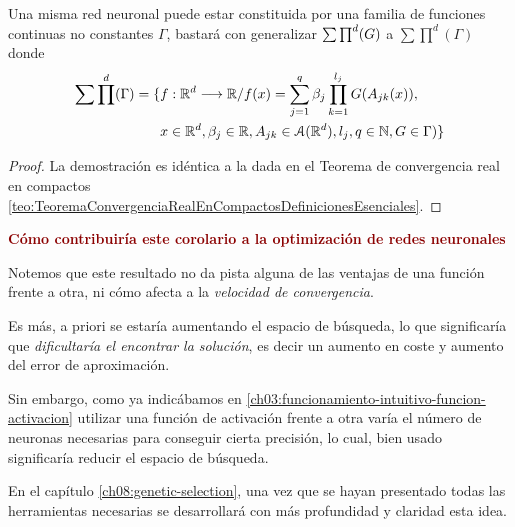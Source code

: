 \begin{aportacionOriginal}

\begin{corolario} \label{cor:se-generaliza-G-a-una-familia}

    Una misma red neuronal puede estar constituida por una familia de funciones continuas no constantes $\Gamma$, 
    bastará con generalizar $\sum \prod^d (G)$ a $\sum \prod ^d (\Gamma)$ donde 
    \begin{equation}
        \begin{split}
            \sum \prod^d (\Gamma) = \{ 
                &f: \mathbb{R}^d \longrightarrow \mathbb{R} /
                f(x) = \sum_{j = 1} ^q  \beta_j \prod_{k=1}^{l_j}
                G(A_{jk}(x)), \\
                &x  \in \mathbb{R}^d, \beta_j \in \mathbb{R}, A_{jk}\in \mathcal{A}(\mathbb{R}^d), l_j,q \in \mathbb{N}, G \in \Gamma
                )
                \}
        \end{split}
    \end{equation}
\end{corolario}
\begin{proof}
    La demostración es idéntica a la dada en el Teorema de convergencia 
    real en compactos \ref{teo:TeoremaConvergenciaRealEnCompactosDefinicionesEsenciales}.
\end{proof}
\end{aportacionOriginal}

\iconoClave  \textcolor{darkRed}{ \textbf{Cómo contribuiría este corolario a la optimización de redes neuronales}}

Notemos que este resultado no da pista alguna de las ventajas de una función frente a otra,
ni cómo afecta a la \textit{velocidad de convergencia}.

Es más, a priori se estaría aumentando el espacio de búsqueda, lo que significaría que \textit{dificultaría el encontrar la solución}, es decir
un aumento en coste y aumento del error de aproximación.

Sin embargo, como ya indicábamos en 
\ref{ch03:funcionamiento-intuitivo-funcion-activacion}
utilizar una función de activación frente a otra
varía el número de neuronas necesarias para 
conseguir cierta precisión, lo cual,
bien usado  significaría
reducir el espacio de búsqueda.

En el capítulo \ref{ch08:genetic-selection}, una vez que 
se hayan presentado todas las herramientas necesarias 
se desarrollará con más profundidad y claridad esta idea.


